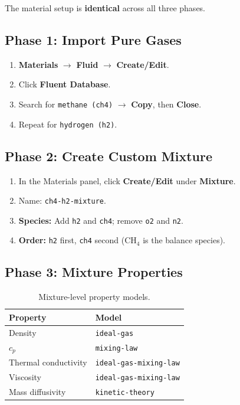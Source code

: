 \documentclass[12pt,a4paper]{report}
\begin{document}
The material setup is \textbf{identical} across all three phases.

\subsection{Phase 1: Import Pure Gases}

\begin{enumerate}
  \item \textbf{Materials} $\rightarrow$ \textbf{Fluid} $\rightarrow$
        \textbf{Create/Edit}.
  \item Click \textbf{Fluent Database}.
  \item Search for \texttt{methane (ch4)} $\rightarrow$ \textbf{Copy},
        then \textbf{Close}.
  \item Repeat for \texttt{hydrogen (h2)}.
\end{enumerate}

\subsection{Phase 2: Create Custom Mixture}

\begin{enumerate}
  \item In the Materials panel, click \textbf{Create/Edit} under
        \textbf{Mixture}.
  \item Name: \texttt{ch4-h2-mixture}.
  \item \textbf{Species:} Add \texttt{h2} and \texttt{ch4}; remove
        \texttt{o2} and \texttt{n2}.
  \item \textbf{Order:} \texttt{h2} first, \texttt{ch4} second
        (CH$_4$ is the balance species).
\end{enumerate}

\subsection{Phase 3: Mixture Properties}

\begin{table}[H]
\centering
\caption{Mixture-level property models.}
\begin{tabular}{@{}ll@{}}
\toprule
\textbf{Property} & \textbf{Model} \\
\midrule
Density              & \texttt{ideal-gas} \\
$c_p$                & \texttt{mixing-law} \\
Thermal conductivity & \texttt{ideal-gas-mixing-law} \\
Viscosity            & \texttt{ideal-gas-mixing-law} \\
Mass diffusivity     & \texttt{kinetic-theory} \\
\bottomrule
\end{tabular}
\end{table}
\end{document}
